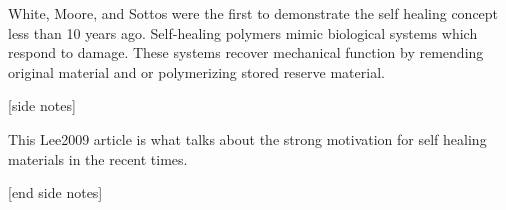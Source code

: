 \documentclass[11pt]{article} %
\begin{document}
\cite{Zhao2012}

White, Moore, and Sottos were the first to demonstrate the self healing concept less than 10 years ago. Self-healing polymers mimic biological systems which respond to damage. These systems recover mechanical function by remending original material and or polymerizing stored reserve material. 

[side notes]

This Lee2009 article is what talks about the strong motivation for self healing materials in the recent times.

[end side notes]

\cite{Lee2009}





\end{document}
